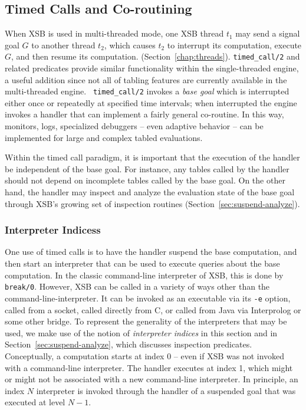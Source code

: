 
\subsection{Timed Calls and Co-routining} \label{sec:timed-call}
When XSB is used in multi-threaded mode, one XSB thread $t_1$ may send
a signal goal $G$ to another thread $t_2$, which causes $t_2$ to
interrupt its computation, execute $G$, and then resume its
computation.  (Section~\ref{chap:threads}).  {\tt timed\_call/2} and
related predicates provide similar functionality within the
single-threaded engine, a useful addition since not all of tabling
features are currently available in the multi-threaded engine.  {\tt
  timed\_call/2} invokes a {\em base goal} which is interrupted either
once or repeatedly at specified time intervals; when interrupted the
engine invokes a handler that can implement a fairly general
co-routine.  In this way, monitors, logs, specialized debuggers --
even adaptive behavior -- can be implemented for large and complex
tabled evaluations.

Within the timed call paradigm, it is important that the execution of
the handler be independent of the base goal.  For instance, any tables
called by the handler should not depend on incomplete tables called by
the base goal.  On the other hand, the handler may inspect and analyze
the evaluation state of the base goal through XSB's growing set of
inspection routines (Section~\ref{sec:suspend-analyze}).

\subsubsection{Interpreter Indicess}
%
One use of timed calls is to have the handler suspend the base
computation, and then start an interpreter that can be used to execute
queries about the base computation.  In the classic command-line
interpreter of XSB, this is done by {\tt break/0}.  However, XSB can
be called in a variety of ways other than the
command-line-interpreter.  It can be invoked as an executable via its
{\tt -e} option, called from a socket, called directly from C, or
called from Java via Interprolog or some other bridge.  To represent
the generality of the interpreters that may be used, we make use of
the notion of {\em interpreter indices} in this section and in
Section~\ref{sec:suspend-analyze}, which discusses inspection
predicates.  Conceptually, a computation starts at index 0 -- even if
XSB was not invoked with a command-line interpreter.  The handler
executes at index 1, which might or might not be associated with a new
command-line interpreter.  In principle, an index $N$ interpreter is
invoked through the handler of a suspended goal that was executed at
level $N-1$.

